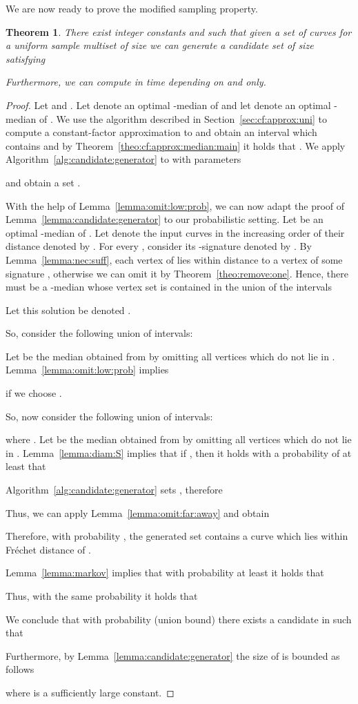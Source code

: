 \documentclass[11pt, letter]{article}
\newtheorem{theorem}{Theorem}[section]
\newcommand{\secref}[1]{Section~\ref{sec:#1}}
\newcommand{\thmlab}[1]{{\label{theo:#1}}}
\newcommand{\thmref}[1]{Theorem~\ref{theo:#1}}
\newcommand{\lemref}[1]{Lemma~\ref{lemma:#1}}
\newcommand{\algref}[1]{Algorithm~\ref{alg:#1}}
\newcommand{\Frechet}{Fr\'echet\xspace}
\begin{document}
We are now ready to prove the modified sampling property.
\begin{theorem}\thmlab{modified:sampling:prop}
There exist  integer constants  and
 such that given a set of curves
  for a uniform
sample multiset  of size 
we can generate a candidate set  of size  satisfying
 
Furthermore, we can compute  in time depending on  and  only.
\end{theorem}

\begin{proof}
Let  and .
Let  denote an optimal -median of  and let  denote an optimal -median of .  
We use the algorithm described in \secref{cf:approx:uni} to compute a
constant-factor approximation to  and obtain an interval 
 which contains
 and by \thmref{cf:approx:median:main} it holds
that .
We apply \algref{candidate:generator} to  with parameters

and obtain a set .

With the help of \lemref{omit:low:prob}, we can now adapt the proof of 
\lemref{candidate:generator} to our probabilistic setting.
Let  be an optimal 
-median of .
Let  denote the input curves in the increasing order of their
distance denoted by . For every ,
consider its -signature denoted by .   
By \lemref{nec:suff}, each vertex of
 lies within distance  to a vertex of some signature
, otherwise we can omit it by \thmref{remove:one}.  Hence, there must
be a -median whose vertex set is contained in the union of
the intervals 
 
Let this solution be denoted . 


So, consider the following union of intervals: 


Let  be the median obtained from  by
omitting all vertices which do not lie in . 
\lemref{omit:low:prob} implies 

if we choose .

So, now consider the following union of intervals: 

where .
Let  be the median obtained from  by
omitting all vertices which do not lie in .
\lemref{diam:S} implies that if , then
it holds with a probability of at least  that

\algref{candidate:generator} sets , therefore  

Thus, we can apply \lemref{omit:far:away} and obtain 

Therefore, with probability , the generated set
 contains a curve 
which lies within \Frechet distance  of . 

\lemref{markov} implies that with probability at least  it holds that 

Thus, with the same probability it holds that


We conclude that with probability  (union bound)
there exists a candidate in  such that


Furthermore, by \lemref{candidate:generator} the size of  is bounded as follows

where  is a sufficiently large constant.
\end{proof}
\end{document}
